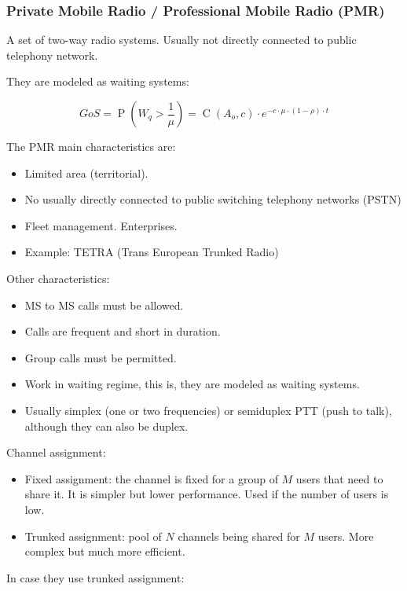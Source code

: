 \documentclass[../main.tex]{subfiles}
\begin{document}
\subsubsection{Private Mobile Radio / Professional Mobile Radio (PMR)}

A set of two-way radio systems. Usually not directly connected to public telephony network.

They are modeled as waiting systems:

$$
	GoS = \operatorname{P} \left( W_q > \frac{1}{\mu} \right) = \operatorname{C}(A_o, c) \cdot e^{- c \cdot \mu \cdot (1-\rho) \cdot t}
$$

The PMR main characteristics are:

\begin{itemize}
	\item Limited area (territorial).
	\item No usually directly connected to public switching telephony networks (PSTN)
	\item Fleet management. Enterprises.
	\item Example: TETRA (Trans European Trunked Radio)
\end{itemize}

Other characteristics:

\begin{itemize}
	\item MS to MS calls must be allowed.
	\item Calls are frequent and short in duration.
	\item Group calls must be permitted.
	\item Work in waiting regime, this is, they are modeled as waiting systems.
	\item Usually simplex (one or two frequencies) or semiduplex PTT (push to talk), although they can also be duplex.
\end{itemize}

Channel assignment:

\begin{itemize}
	\item Fixed assignment: the channel is fixed for a group of $M$ users that need to share it. It is simpler but lower performance. Used if the number of users is low.
	\item Trunked assignment: pool of $N$ channels being shared for $M$ users. More complex but much more efficient.
\end{itemize}

In case they use trunked assignment:
\end{document}
